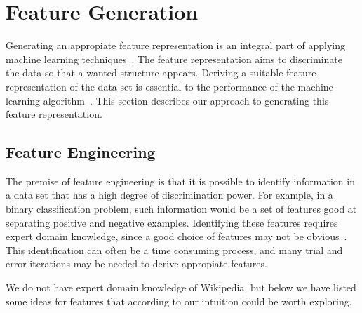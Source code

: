 \section{Feature Generation}\label{sec:feature_generation}
Generating an appropiate feature representation is an integral part of applying machine learning techniques~\cite{ng-lecture}. The feature representation aims to discriminate the data so that a wanted structure appears. Deriving a suitable feature representation of the data set is essential to the performance of the machine learning algorithm~\cite{ng-lecture}. This section describes our approach to generating this feature representation.



\subsection{Feature Engineering}
The premise of feature engineering is that it is possible to identify information in a data set that has a high degree of discrimination power. For example, in a binary classification problem, such information would be a set of features good at separating positive and negative examples. Identifying these features requires expert domain knowledge, since a good choice of features may not be obvious~\cite{ng-lecture}. This identification can often be a time consuming process, and many trial and error iterations may be needed to derive appropiate features.

We do not have expert domain knowledge of Wikipedia, but below we have listed some ideas for features that according to our intuition could be worth exploring.

